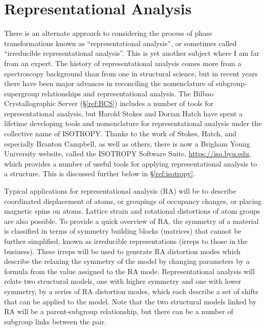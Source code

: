 \section{Representational Analysis}\label{ref:RA}
There is an alternate approach to considering the process of phase transformations known as ``representational analysis'', or sometimes called ``irreducible representational analysis''. This is yet another subject where I am far from an expert. The history of representational analysis comes more from a spectroscopy background than from one in structural science, but in recent years there have been major advances in reconciling the nomenclature of subgroup-supergroup relationships and representational analysis. The Bilbao Crystallographic Server (\S\ref{ref:BCS}) includes a number of tools for representational analysis, but Harold Stokes and Dorian Hatch have spent a lifetime developing tools and nomenclature for representational analysis under the collective name of ISOTROPY. Thanks to the work of Stokes, Hatch, and especially Branton Campbell, as well as others, there is now a Brigham Young University website, called the ISOTROPY Software Suite, \url{https://iso.byu.edu}, which provides a number of useful tools for applying representational analysis to a structure. This is discussed further below in \S\ref{ref:isotropy}.

Typical applications for representational analysis (RA) will be to describe coordinated displacement of atoms, or groupings of occupancy changes, or placing magnetic spins on atoms. Lattice strain and rotational distortions of atom groups are also possible. To provide a quick overview of RA, the symmetry of a material is classified in terms of symmetry building blocks (matrices) that cannot be further simplified, known as irreducible representations (irreps to those in the business). These irreps will be used to generate RA distortion modes which describe the relaxing the symmetry of the model by changing parameters by a formula from the value assigned to the RA mode. Representational analysis will relate two structural models, one with higher symmetry and one with lower symmetry, by a series of RA distortion modes, which each describe a set of shifts that can be applied to the model. Note that the two structural models linked by RA will be a parent-subgroup relationship, but there can be a number of subgroup links between the pair. 

